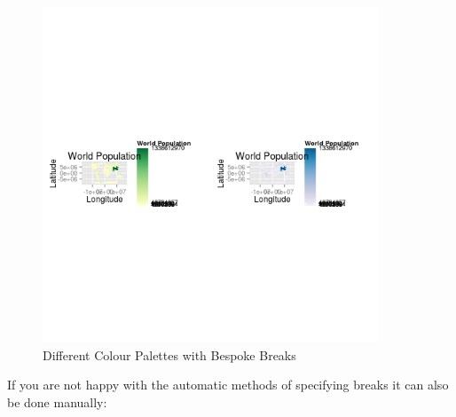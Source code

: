\documentclass[]{article}
\let\Oldincludegraphics\includegraphics
\renewcommand{\includegraphics}[1]{\Oldincludegraphics[width=10cm]{#1}}
\begin{document}
\begin{figure}[htbp]
\centering
\includegraphics{figure/Different_Colour_Palettes_with_Bespoke_Breaks.png}
\caption{Different Colour Palettes with Bespoke Breaks}
\end{figure}

If you are not happy with the automatic methods of specifying breaks it
can also be done manually:
\end{document}
